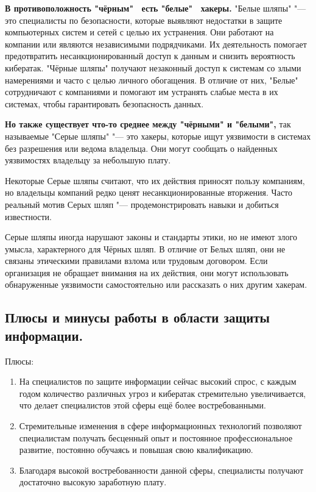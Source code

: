 \textbf{В противоположность "чёрным" \ есть "белые" \  хакеры.} "Белые шляпы" "---  это специалисты по безопасности, которые выявляют недостатки в защите компьютерных систем и сетей с целью их устранения. Они работают на компании или являются независимыми 
подрядчиками. Их деятельность помогает предотвратить несанкционированный доступ к данным и снизить вероятность кибератак.
"Чёрные шляпы" получают незаконный доступ к системам со злыми намерениями и часто с целью личного обогащения. В отличие от 
них, "Белые" сотрудничают с компаниями и помогают им устранять слабые места в их системах, чтобы гарантировать 
безопасность данных.

\textbf{Но также существует что-то среднее между "чёрными" и "белыми",} так называемые "Серые шляпы" "---  это хакеры, которые ищут 
уязвимости в системах без разрешения или ведома владельца. Они могут сообщать о найденных уязвимостях владельцу за небольшую 
плату.

Некоторые Серые шляпы считают, что их действия приносят пользу компаниям, но владельцы компаний редко ценят 
несанкционированные вторжения. Часто реальный мотив Серых шляп "---  продемонстрировать навыки и добиться известности.

Серые шляпы иногда нарушают законы и стандарты этики, но не имеют злого умысла, характерного для Чёрных шляп. В отличие от 
Белых шляп, они не связаны этическими правилами взлома или трудовым договором. Если организация не обращает внимания на их 
действия, они могут использовать обнаруженные уязвимости самостоятельно или рассказать о них другим хакерам.\cite{kaspersky}


\newpage
\subsection{Плюсы и минусы работы в области защиты информации.}
Плюсы:
\begin{enumerate}
    \item На специалистов по защите информации сейчас высокий спрос, с каждым годом количество различных угроз и кибератак 
    стремительно увеличивается, что делает специалистов этой сферы ещё более востребованными.
    \item Стремительные изменения в сфере информационных технологий позволяют специалистам получать бесценный опыт и 
    постоянное профессиональное развитие, постоянно обучаясь и повышая свою квалификацию.
    \item Благодаря высокой востребованности данной сферы, специалисты получают достаточно высокую заработную плату.
\end{enumerate}
 
